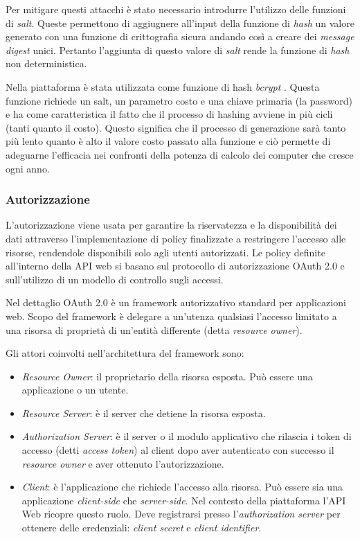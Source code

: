Per mitigare questi attacchi è stato necessario introdurre l'utilizzo delle funzioni di \textit{salt}.
Queste permettono di aggiugnere all'input della funzione di \textit{hash} un valore generato con una funzione di crittografia sicura andando così a creare dei \textit{message digest} unici.
Pertanto l'aggiunta di questo valore di \textit{salt} rende la funzione di \textit{hash} non deterministica.

Nella piattaforma è stata utilizzata come funzione di hash \textit{bcrypt} \cite{bcrypt}. Questa funzione richiede un salt, un parametro costo e una chiave primaria (la password) e ha come
caratteristica il fatto che il processo di hashing avviene in più cicli (tanti quanto il costo). Questo significa che il processo di generazione sarà tanto più lento quanto è alto il valore
costo passato alla funzione e ciò permette di adeguarne l'efficacia nei confronti della potenza di calcolo dei computer che cresce ogni anno.

\subsubsection{Autorizzazione}
L'autorizzazione viene usata per garantire la riservatezza e la disponibilità dei dati attraverso l'implementazione di policy finalizzate a restringere l'accesso alle risorse,
rendendole disponibili solo agli utenti autorizzati.
Le policy definite all'interno della API web si basano sul protocollo di autorizzazione OAuth 2.0 \cite{rfc6749} e sull'utilizzo di un
modello di controllo sugli accessi.

Nel dettaglio OAuth 2.0 è un framework autorizzativo standard per applicazioni web.
Scopo del framework è delegare a un'utenza qualsiasi l'accesso limitato a una risorsa di proprietà di un'entità differente (detta \textit{resource owner}).

Gli attori coinvolti nell'architettura del framework sono:
\begin{itemize}
    \itemsep0em
    \item \textit{Resource Owner}: il proprietario della risorsa esposta. Può essere una applicazione o un utente.
    \item \textit{Resource Server}: è il server che detiene la risorsa esposta.
    \item \textit{Authorization Server}: è il server o il modulo applicativo che rilascia i token di accesso (detti \textit{access token}) al client dopo aver
          autenticato con successo il \textit{resource owner} e aver ottenuto l'autorizzazione.
    \item  \textit{Client}: è l'applicazione che richiede l'accesso alla risorsa. Può essere sia una applicazione \textit{client-side} che \textit{server-side}.
          Nel contesto della piattaforma l'API Web ricopre questo ruolo.
          Deve registrarsi presso l'\textit{authorization server} per ottenere delle credenziali: \textit{client secret} e \textit{client identifier}.
\end{itemize}

